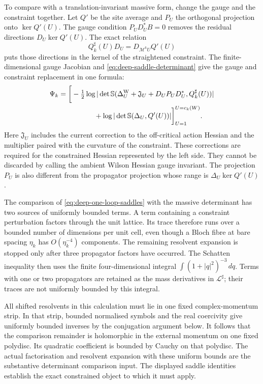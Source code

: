 \documentclass[11pt,letterpaper,reqno]{amsart}
\theoremstyle{definition}
\theoremstyle{remark}
\begin{document}
To compare with a translation-invariant massive form,
change the gauge and the constraint together. Let $Q'$
be the site average and $P_U$ the orthogonal projection
onto $\ker Q'(U)$. The gauge condition
$P_UD_U^*B=0$ removes the residual directions
$D_U\ker Q'(U)$. The exact relation
\[
 Q_k^\sharp(U)D_U=D_{\mathcal M^kU}Q'(U)
\]
puts those directions in the kernel of the straightened
constraint. The finite-dimensional gauge Jacobian and
\eqref{eq:deep-saddle-determinant} give the gauge and
constraint replacement in one formula:
\begin{equation}\label{eq:deep-one-loop-saddles}
 \begin{split}
 \Psi_k={}&\bigg[-\tfrac12\log|\det\mathbb S(
       \Delta_U^{\mathrm W}+\mathfrak J_U+D_UP_UD_U^*,
                                        Q_k^\sharp(U))|\\
       &\hspace{13mm}
       +\log|\det\mathbb S(\Delta_U,Q'(U))|\bigg]_{U=1}^{U=c_k(W)}.
 \end{split}
\end{equation}
Here $\mathfrak J_U$ includes the current correction to
the off-critical action Hessian and the multiplier paired
with the curvature of the constraint. These corrections
are required for the constrained Hessian represented by
the left side. They cannot be discarded by calling the
ambient Wilson Hessian gauge invariant. The projection
$P_U$ is also different from the propagator projection
whose range is $\Delta_U\ker Q'(U)$.

The comparison of \eqref{eq:deep-one-loop-saddles} with
the massive determinant has two sources of uniformly
bounded terms. A term containing a constraint perturbation
factors through the unit lattice. Its trace therefore
runs over a bounded number of dimensions per unit cell,
even though a Bloch fibre at bare spacing $\eta_k$ has
$O(\eta_k^{-4})$ components. The remaining resolvent
expansion is stopped only after three propagator factors
have occurred. The Schatten inequality then uses the
finite four-dimensional integral
$\int(1+|q|^2)^{-3}\,dq$. Terms with one or two
propagators are retained as the mass derivatives in
$\mathcal L^\sharp$; their traces are not uniformly
bounded by this integral.

All shifted resolvents in this calculation must lie
in one fixed complex-momentum strip. In that strip,
bounded normalised symbols and the real coercivity
give uniformly bounded inverses by the conjugation
argument below. It follows that the comparison
remainder is holomorphic in the external momentum
on one fixed polydisc. Its quadratic coefficient is
bounded by Cauchy on that polydisc. The actual
factorisation and resolvent expansion with these
uniform bounds are the substantive determinant
comparison input. The displayed saddle identities
establish the exact constrained object to which it
must apply.
\end{document}
